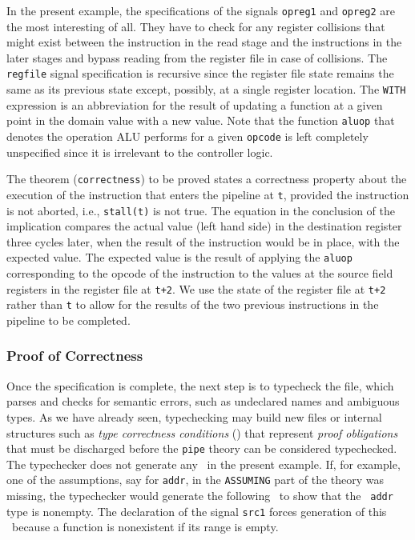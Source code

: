In the present example, the specifications of the signals
{\tt opreg1} and {\tt opreg2} are the most interesting of all.
They have to check for any register collisions that might
exist between the instruction in the
read stage and the instructions in the later stages and bypass reading
from the register file in case of collisions.
The {\tt regfile} signal specification is recursive since the register
file state remains the same as its previous state except,
possibly, at a single register location.
The {\tt WITH} expression is an abbreviation for the result
of updating a function at a given point in the domain value with a new value.
Note that the function {\tt aluop} that denotes the operation ALU performs
for a given {\tt opcode} is left completely unspecified since it
is irrelevant to the controller logic.

The theorem ({\tt correctness}) to be proved states a correctness property
about the execution of the instruction that enters the pipeline at
{\tt t}, provided the instruction is not aborted, i.e., {\tt stall(t)} is
not true.
The equation in the conclusion of the implication compares the
actual value (left hand side) in the destination register three
cycles later, when the result of the instruction would be in place,
with the expected value.
The expected value is the result of applying the {\tt aluop} corresponding
to the opcode of the instruction to the values at the source field
registers in the register file at {\tt t+2}.
We use the state of the register file at {\tt t+2} rather than {\tt t}
to allow for the results of the two previous instructions in the pipeline
to be completed.

\subsubsection{Proof of Correctness}

Once the specification is complete, the next step is to typecheck the
file, which parses and checks for semantic errors, such as undeclared
names and ambiguous types.  As we have already seen, typechecking may
build new files or internal structures such as {\em type correctness
conditions} ({\em \tccs}) that represent {\em proof obligations\/}
that must be discharged before the {\tt pipe} theory can be considered
typechecked.  The typechecker does not generate any \tccs\ in the
present example.  If, for example, one of the assumptions, say for
{\tt addr}, in the {\tt ASSUMING} part of the theory was missing, the
typechecker would generate the following \tcc\ to show that the {\tt
addr} type is nonempty.  The declaration of the signal {\tt src1}
forces generation of this \tcc\ because a function is nonexistent if
its range is empty.

